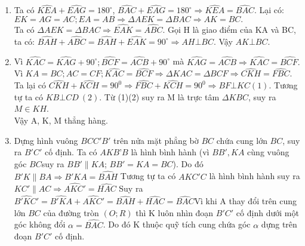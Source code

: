 \begin{ex}
{\begin{center}
\begin{tikzpicture}[scale=.5]
    \end{tikzpicture}
    \end{center}
    \begin{enumerate}
        \item Ta có $\widehat{KEA}+\widehat{EAG}={180}^\circ$,  $\widehat{BAC}+\widehat{EAG}={180}^\circ\Rightarrow \widehat{KEA}=\widehat{BAC}$. Lại có: 
        $EK=AG=AC;EA=AB\Rightarrow \Delta AEK=\Delta BAC\Rightarrow AK=BC.$\\
        Ta có 
        $\Delta AEK=\Delta BAC\Rightarrow \widehat{EAK}=\widehat{ABC}$. Gọi H là giao điểm của KA và BC, ta có: 
        $\widehat{BAH}+\widehat{ABC}=\widehat{BAH}+\widehat{EAK}={90}^\circ\Rightarrow AH\bot BC$. Vậy $AK\bot BC$. 
        \item Vì $\widehat{KAC}=\widehat{KAG}+{90}^\circ; \widehat{BCF}=\widehat{ACB}+{90}^\circ$ mà $\widehat{KAG}=\widehat{ACB}\Rightarrow \widehat{KAC}=\widehat{BCF.}$
        Vì $KA=BC; AC=CF; \widehat{KAC}=\widehat{BCF}\Rightarrow \Delta KAC=\Delta BCF\Rightarrow \widehat{CKH}=\widehat{FBC}. $ Ta lại có $\widehat{CKH}+\widehat{KCH}={90}^0\Rightarrow \widehat{FBC}+\widehat{KCH}={90}^0\Rightarrow BF\bot KC(1)$. Tương tự ta có $KB\bot CD\ (2)$. Từ (1)(2) suy ra M là trực tâm $\Delta KBC$, suy ra $M\in KH$.\\ Vậy A, K, M thẳng hàng.
        \item Dựng hình vuông $BCC'B'$ trên nửa mặt phẳng bờ $BC$ chứa cung lớn $BC$, suy ra $B'C'$  cố định. Ta có $AKB’B$ là hình bình hành (vì $BB', KA$ cùng vuông góc $BC$suy ra $BB'\parallel KA$; $BB'=KA=BC$). Do đó $B'K\parallel BA\Rightarrow \widehat{B'KA}=\widehat{BAH}$ Tương tự ta có $AKC'C$  là hình bình hành suy ra $KC'\parallel AC\Rightarrow \widehat{AKC'}=\widehat{HAC}$ Suy ra $\widehat{B'KC'}=\widehat{B'KA}+\widehat{AKC'}=\widehat{BAH}+\widehat{HAC}=\widehat{BAC}$Vì khi A thay đổi trên cung lớn $BC$ của đường tròn $(O; R)$ thì  K  luôn nhìn đoạn $B'C'$ cố định dưới một góc không đổi $\alpha =\widehat{BAC}$. Do đó K thuộc quỹ tích cung chứa góc $\alpha $ dựng trên đoạn $B'C'$ cố định.  
    \end{enumerate}
    }
\end{ex}

